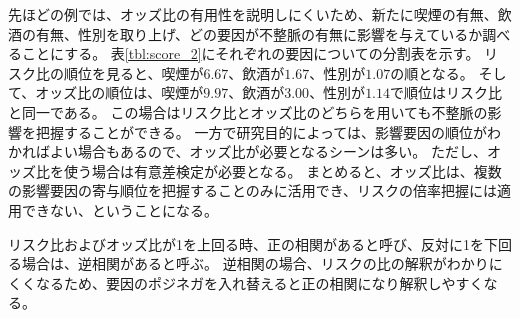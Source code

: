 \documentclass{ltjsarticle}
\begin{document}
先ほどの例では、オッズ比の有用性を説明しにくいため、新たに喫煙の有無、飲酒の有無、性別を取り上げ、どの要因が不整脈の有無に影響を与えているか調べることにする。
表\ref{tbl:score_2}にそれぞれの要因についての分割表を示す。
リスク比の順位を見ると、喫煙が$6.67$、飲酒が$1.67$、性別が$1.07$の順となる。
そして、オッズ比の順位は、喫煙が$9.97$、飲酒が$3.00$、性別が$1.14$で順位はリスク比と同一である。
この場合はリスク比とオッズ比のどちらを用いても不整脈の影響を把握することができる。
一方で研究目的によっては、影響要因の順位がわかればよい場合もあるので、オッズ比が必要となるシーンは多い。
ただし、オッズ比を使う場合は有意差検定が必要となる。
まとめると、オッズ比は、複数の影響要因の寄与順位を把握することのみに活用でき、リスクの倍率把握には適用できない、ということになる。

リスク比およびオッズ比が1を上回る時、正の相関があると呼び、反対に1を下回る場合は、逆相関があると呼ぶ。
逆相関の場合、リスクの比の解釈がわかりにくくなるため、要因のポジネガを入れ替えると正の相関になり解釈しやすくなる。
\end{document}
